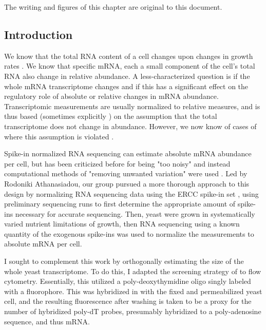 The writing and figures of this chapter are original to this document.

%
%
%
\subsection{Introduction}
%
%
%


We know that the total RNA content of a cell changes upon changes in
growth rates \parencite{waldron1975effect}.
We know that specific mRNA, each a small component of the cell's 
total RNA also change in relative abundance. A less-characterized 
question is if the whole mRNA transcriptome changes
and if this has a significant effect on the regulatory role
of absolute or relative changes in mRNA abundance.
Transcriptomic measurements are usually normalized to relative
measures, and is thus based (sometimes explicitly
\parencite{love2014moderated})
on the assumption that the total transcriptome does not change in 
abundance.  However, we now know of cases of where this 
assumption is violated \parencite{nie2012c}.

Spike-in normalized RNA sequencing can estimate absolute mRNA
abundance per cell, but has been criticized before for
being "too noisy" and instead computational methods of "removing
unwanted variation" were used \parencite{risso2014normalization}. 
Led by Rodoniki Athanasiadou, our group pursued a more thorough approach
to this design by normalizing RNA sequencing data using the ERCC
spike-in set \parencite{jiang2011synthetic}, 
using preliminary sequencing runs
to first determine the appropriate amount of spike-ins necessary for
accurate sequencing. Then, yeast were grown in systematically varied
nutrient limitations of growth, then RNA sequencing using a known
quantity of the exogenous spike-ins was used to normalize the
measurements to absolute mRNA per cell.

I sought to complement this work by orthogonally estimating the size 
of the whole yeast transcriptome. To do this, I adapted the screening 
strategy of \cite{amberg1992isolation} to flow cytometry. 
Essentially, this utilized a poly-deoxythymidine oligo singly labeled
with a fluorophore. This was hybridized in with the fixed and
permeabilized yeast cell, and the resulting fluorescence after washing
is taken to be a proxy for the number of hybridized poly-dT probes,
presumably hybridized to a poly-adenosine sequence, and thus mRNA.

